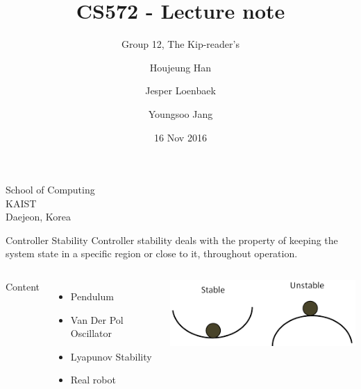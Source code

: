 \documentclass{beamer}
\begin{document}
\title{CS572 - Lecture note}
\subtitle{Group 12, The Kip-reader's}
\author{Houjeung Han \and Jesper Loenbaek \and Youngsoo Jang}
\institute%
{
    School of Computing\\
    KAIST\\
    Daejeon, Korea
}

\date{16 Nov 2016}
\frame{\titlepage}

\begin{frame}{Controller Stability}
    Controller stability deals with the property of keeping the system state in a specific region or close to it, throughout operation.\\
    \vspace{0.5cm}
    \begin{columns}[T]
        \begin{center}
            {\Large\color[rgb]{0.2,0.2,0.7} Content}
        \end{center}
        \begin{itemize}
            \item Pendulum
            \item Van Der Pol Oscillator 
            \item Lyapunov Stability
            \item Real robot 
        \end{itemize}
        \begin{center}
            \vspace{0.5cm}
            \includegraphics[width=\textwidth]{fig/stable.png}   
        \end{center}
    \end{columns}
\end{frame}

\end{document}
